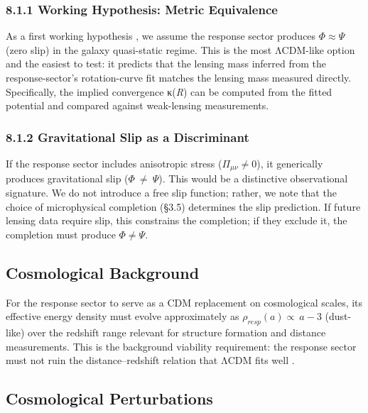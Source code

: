\documentclass[11pt]{article}
\begin{document}
\subsubsection{8.1.1 Working Hypothesis: Metric Equivalence}\label{working-hypothesis-metric-equivalence}

As a first working hypothesis \citep{Wald1984GR, Carroll2019}, we assume the response sector produces \(\Phi \approx \Psi\) (zero slip) in the galaxy quasi-static regime. This is the most ΛCDM-like option and the easiest to test: it predicts that the lensing mass inferred from the response-sector's rotation-curve fit matches the lensing mass measured directly. Specifically, the implied convergence κ(\emph{R}) can be computed from the fitted potential and compared against weak-lensing measurements.

\subsubsection{8.1.2 Gravitational Slip as a Discriminant}\label{gravitational-slip-as-a-discriminant}

If the response sector includes anisotropic stress (\(\Pi_{\mu\nu} \neq 0\)), it generically produces gravitational slip (\(\Phi\  \neq \ \Psi\)). This would be a distinctive observational signature. We do not introduce a free slip function; rather, we note that the choice of microphysical completion (§3.5) determines the slip prediction. If future lensing data require slip, this constrains the completion; if they exclude it, the completion must produce \(\Phi \neq \Psi\).

\subsection{Cosmological Background}\label{cosmological-background}

For the response sector to serve as a CDM replacement on cosmological scales, its effective energy density must evolve approximately as \(\rho_{resp}(a) \propto \ a - 3\) (dust-like) over the redshift range relevant for structure formation and distance measurements. This is the background viability requirement: the response sector must not ruin the distance--redshift relation that ΛCDM fits well \citep{Buchert2000, Rasanen2006, Riess2019}.

\subsection{Cosmological Perturbations}\label{cosmological-perturbations}
\end{document}
